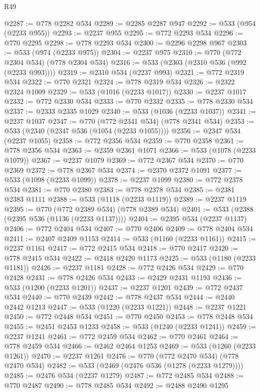 \begin{lexlean}{R49}
\begin{coremodule}
@2287 := @778 @2282 @534
@2289 := @2285 @2287 @947
@2292 := @533 (@954 (@2233 @955))
@2293 := @2237 @955
@2295 := @772 @2293 @534
@2296 := @770 @2295
@2298 := @778 @2293 @534
@2300 := @2296 @2298 @967
@2303 := @533 (@974 (@2233 @975))
@2304 := @2237 @975
@2310 := @770 (@772 @2304 @534) (@778 @2304 @534)
@2316 := @533 (@2303 (@2310 @536 (@992 (@2233 @993))))
@2319 := @2310 @534 (@2237 @993)
@2321 := @772 @2319 @534
@2322 := @770 @2321
@2324 := @778 @2319 @534
@2326 := @2322 @2324 @1009
@2329 := @533 (@1016 (@2233 @1017))
@2330 := @2237 @1017
@2332 := @772 @2330 @534
@2333 := @770 @2332
@2335 := @778 @2330 @534
@2337 := @2333 @2335 @1029
@2340 := @533 (@1036 (@2233 @1037))
@2341 := @2237 @1037
@2347 := @770 (@772 @2341 @534) (@778 @2341 @534)
@2353 := @533 (@2340 (@2347 @536 (@1054 (@2233 @1055))))
@2356 := @2347 @534 (@2237 @1055)
@2358 := @772 @2356 @534
@2359 := @770 @2358
@2361 := @778 @2356 @534
@2363 := @2359 @2361 @1071
@2366 := @533 (@1078 (@2233 @1079))
@2367 := @2237 @1079
@2369 := @772 @2367 @534
@2370 := @770 @2369
@2372 := @778 @2367 @534
@2374 := @2370 @2372 @1091
@2377 := @533 (@1098 (@2233 @1099))
@2378 := @2237 @1099
@2380 := @772 @2378 @534
@2381 := @770 @2380
@2383 := @778 @2378 @534
@2385 := @2381 @2383 @1111
@2388 := @533 (@1118 (@2233 @1119))
@2389 := @2237 @1119
@2395 := @770 (@772 @2389 @534) (@778 @2389 @534)
@2401 := @533 (@2388 (@2395 @536 (@1136 (@2233 @1137))))
@2404 := @2395 @534 (@2237 @1137)
@2406 := @772 @2404 @534
@2407 := @770 @2406
@2409 := @778 @2404 @534
@2411 := @2407 @2409 @1153
@2414 := @533 (@1160 (@2233 @1161))
@2415 := @2237 @1161
@2417 := @772 @2415 @534
@2418 := @770 @2417
@2420 := @778 @2415 @534
@2422 := @2418 @2420 @1173
@2425 := @533 (@1180 (@2233 @1181))
@2426 := @2237 @1181
@2428 := @772 @2426 @534
@2429 := @770 @2428
@2431 := @778 @2426 @534
@2433 := @2429 @2431 @1193
@2436 := @533 (@1200 (@2233 @1201))
@2437 := @2237 @1201
@2439 := @772 @2437 @534
@2440 := @770 @2439
@2442 := @778 @2437 @534
@2444 := @2440 @2442 @1213
@2447 := @533 (@1220 (@2233 @1221))
@2448 := @2237 @1221
@2450 := @772 @2448 @534
@2451 := @770 @2450
@2453 := @778 @2448 @534
@2455 := @2451 @2453 @1233
@2458 := @533 (@1240 (@2233 @1241))
@2459 := @2237 @1241
@2461 := @772 @2459 @534
@2462 := @770 @2461
@2464 := @778 @2459 @534
@2466 := @2462 @2464 @1253
@2469 := @533 (@1260 (@2233 @1261))
@2470 := @2237 @1261
@2476 := @770 (@772 @2470 @534) (@778 @2470 @534)
@2482 := @533 (@2469 (@2476 @536 (@1278 (@2233 @1279))))
@2485 := @2476 @534 (@2237 @1279)
@2487 := @772 @2485 @534
@2488 := @770 @2487
@2490 := @778 @2485 @534
@2492 := @2488 @2490 @1295

\end{coremodule}
\end{lexlean}
